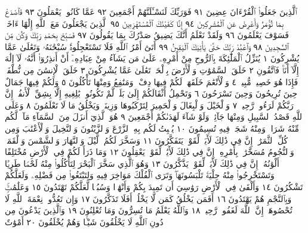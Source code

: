 ٱلَّذِينَ جَعَلُوا۟ ٱلْقُرْءَانَ عِضِينَ ٩١ فَوَرَبِّكَ لَنَسْـَٔلَنَّهُمْ
أَجْمَعِينَ ٩٢ عَمَّا كَانُوا۟ يَعْمَلُونَ ٩٣ فَٱصْدَعْ بِمَا تُؤْمَرُ وَأَعْرِضْ
عَنِ ٱلْمُشْرِكِينَ ٩٤ إِنَّا كَفَيْنَٰكَ ٱلْمُسْتَهْزِءِينَ ٩٥ ٱلَّذِينَ
يَجْعَلُونَ مَعَ ٱللَّهِ إِلَٰهًا ءَاخَرَۚ فَسَوْفَ يَعْلَمُونَ ٩٦ وَلَقَدْ نَعْلَمُ
أَنَّكَ يَضِيقُ صَدْرُكَ بِمَا يَقُولُونَ ٩٧ فَسَبِّحْ بِحَمْدِ رَبِّكَ وَكُن
مِّنَ ٱلسَّٰجِدِينَ ٩٨ وَٱعْبُدْ رَبَّكَ حَتَّىٰ يَأْتِيَكَ ٱلْيَقِينُ ٩٩
أَتَىٰٓ أَمْرُ ٱللَّهِ فَلَا تَسْتَعْجِلُوهُۚ سُبْحَٰنَهُۥ وَتَعَٰلَىٰ عَمَّا يُشْرِكُونَ ١
يُنَزِّلُ ٱلْمَلَٰٓئِكَةَ بِٱلرُّوحِ مِنْ أَمْرِهِۦ عَلَىٰ مَن يَشَآءُ مِنْ
عِبَادِهِۦٓ أَنْ أَنذِرُوٓا۟ أَنَّهُۥ لَآ إِلَٰهَ إِلَّآ أَنَا۠ فَٱتَّقُونِ ٢ خَلَقَ
ٱلسَّمَٰوَٰتِ وَٱلْأَرْضَ بِٱلْحَقِّۚ تَعَٰلَىٰ عَمَّا يُشْرِكُونَ ٣ خَلَقَ
ٱلْإِنسَٰنَ مِن نُّطْفَةࣲ فَإِذَا هُوَ خَصِيمࣱ مُّبِينࣱ ٤ وَٱلْأَنْعَٰمَ
خَلَقَهَاۖ لَكُمْ فِيهَا دِفْءࣱ وَمَنَٰفِعُ وَمِنْهَا تَأْكُلُونَ ٥
وَلَكُمْ فِيهَا جَمَالٌ حِينَ تُرِيحُونَ وَحِينَ تَسْرَحُونَ ٦
وَتَحْمِلُ أَثْقَالَكُمْ إِلَىٰ بَلَدࣲ لَّمْ تَكُونُوا۟ بَٰلِغِيهِ إِلَّا بِشِقِّ
ٱلْأَنفُسِۚ إِنَّ رَبَّكُمْ لَرَءُوفࣱ رَّحِيمࣱ ٧ وَٱلْخَيْلَ وَٱلْبِغَالَ
وَٱلْحَمِيرَ لِتَرْكَبُوهَا وَزِينَةࣰۚ وَيَخْلُقُ مَا لَا تَعْلَمُونَ ٨
وَعَلَى ٱللَّهِ قَصْدُ ٱلسَّبِيلِ وَمِنْهَا جَآئِرࣱۚ وَلَوْ شَآءَ لَهَدَىٰكُمْ
أَجْمَعِينَ ٩ هُوَ ٱلَّذِيٓ أَنزَلَ مِنَ ٱلسَّمَآءِ مَآءࣰۖ لَّكُم
مِّنْهُ شَرَابࣱ وَمِنْهُ شَجَرࣱ فِيهِ تُسِيمُونَ ١٠ يُنۢبِتُ لَكُم
بِهِ ٱلزَّرْعَ وَٱلزَّيْتُونَ وَٱلنَّخِيلَ وَٱلْأَعْنَٰبَ وَمِن كُلِّ
ٱلثَّمَرَٰتِۚ إِنَّ فِي ذَٰلِكَ لَأٓيَةࣰ لِّقَوْمࣲ يَتَفَكَّرُونَ ١١
وَسَخَّرَ لَكُمُ ٱلَّيْلَ وَٱلنَّهَارَ وَٱلشَّمْسَ وَٱلْقَمَرَۖ
وَٱلنُّجُومُ مُسَخَّرَٰتُۢ بِأَمْرِهِۦٓۚ إِنَّ فِي ذَٰلِكَ لَأٓيَٰتࣲ لِّقَوْمࣲ
يَعْقِلُونَ ١٢ وَمَا ذَرَأَ لَكُمْ فِي ٱلْأَرْضِ مُخْتَلِفًا
أَلْوَٰنُهُۥٓۚ إِنَّ فِي ذَٰلِكَ لَأٓيَةࣰ لِّقَوْمࣲ يَذَّكَّرُونَ ١٣
وَهُوَ ٱلَّذِي سَخَّرَ ٱلْبَحْرَ لِتَأْكُلُوا۟ مِنْهُ لَحْمࣰا طَرِيࣰّا
وَتَسْتَخْرِجُوا۟ مِنْهُ حِلْيَةࣰ تَلْبَسُونَهَاۖ وَتَرَى ٱلْفُلْكَ مَوَاخِرَ
فِيهِ وَلِتَبْتَغُوا۟ مِن فَضْلِهِۦ وَلَعَلَّكُمْ تَشْكُرُونَ ١٤
وَأَلْقَىٰ فِي ٱلْأَرْضِ رَوَٰسِيَ أَن تَمِيدَ بِكُمْ وَأَنْهَٰرࣰا وَسُبُلࣰا
لَّعَلَّكُمْ تَهْتَدُونَ ١٥ وَعَلَٰمَٰتࣲۚ وَبِٱلنَّجْمِ هُمْ يَهْتَدُونَ ١٦
أَفَمَن يَخْلُقُ كَمَن لَّا يَخْلُقُۚ أَفَلَا تَذَكَّرُونَ ١٧ وَإِن
تَعُدُّوا۟ نِعْمَةَ ٱللَّهِ لَا تُحْصُوهَآۗ إِنَّ ٱللَّهَ لَغَفُورࣱ رَّحِيمࣱ ١٨
وَٱللَّهُ يَعْلَمُ مَا تُسِرُّونَ وَمَا تُعْلِنُونَ ١٩ وَٱلَّذِينَ يَدْعُونَ
مِن دُونِ ٱللَّهِ لَا يَخْلُقُونَ شَيْـࣰٔا وَهُمْ يُخْلَقُونَ ٢٠ أَمْوَٰتٌ
